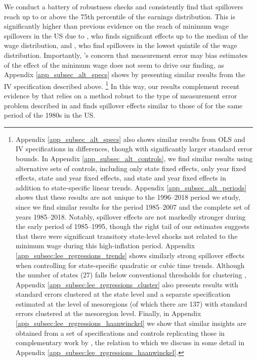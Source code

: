 We conduct a battery of robustness checks and consistently find that spillovers reach up to or above the 75th percentile of the earnings distribution. This is significantly higher than previous evidence on the reach of minimum wage spillovers in the US due to \citet{Lee1999}, who finds significant effects up to the median of the wage distribution, and \citet{Autor2016}, who find spillovers in the lowest quintile of the wage distribution. Importantly, \citet{Autor2016}'s concern that measurement error may bias estimates of the effect of the minimum wage does not seem to drive our finding, as Appendix \ref{app_subsec_alt_specs} shows by presenting similar results from the IV specification described above.%
%
\footnote{Appendix \ref{app_subsec_alt_specs} also shows similar results from OLS and IV specifications in differences, though with significantly larger standard error bounds. In Appendix \ref{app_subsec_alt_controls}, we find similar results using alternative sets of controls, including only state fixed effects, only year fixed effects, state and year fixed effects, and state and year fixed effects in addition to state-specific linear trends. Appendix \ref{app_subsec_alt_periods} shows that these results are not unique to the 1996--2018 period we study, since we find similar results for the period 1985--2007 and the complete set of years 1985--2018. Notably, spillover effects are not markedly stronger during the early period of 1985--1995, though the right tail of our estimates suggests that there were significant transitory state-level shocks not related to the minimum wage during this high-inflation period. Appendix \ref{app_subsec:lee_regressions_trends} shows similarly strong spillover effects when controlling for state-specific quadratic or cubic time trends. Although the number of states (27) falls below conventional thresholds for clustering \citep{CameronMiller2015}, Appendix \ref{app_subsec:lee_regressions_cluster} also presents results with standard errors clustered at the state level and a separate specification estimated at the level of mesoregions (of which there are 137) with standard errors clustered at the mesoregion level. Finally, in Appendix \ref{app_subsec:lee_regressions_haanwinckel} we show that similar insights are obtained from a set of specifications and controls replicating those in complementary work by \citet{Haanwinckel2020}, the relation to which we discuss in some detail in Appendix \ref{app_subsec:lee_regressions_haanwinckel}.} %
%
In this way, our results complement recent evidence by \citet{FortinLemieuxLloyd2021} that relies on a method robust to the type of measurement error problem described in \citet{Autor2016} and finds spillover effects similar to those of \citet{Lee1999} for the same period of the 1980s in the US.

